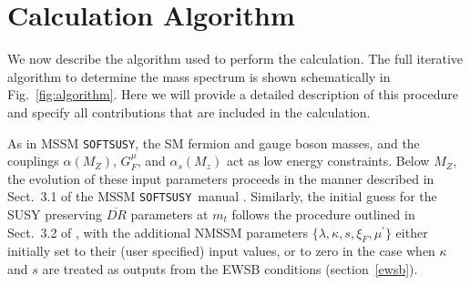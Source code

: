 \documentclass[final,3p,times]{elsarticle}
\def\SOFTSUSY{{\tt SOFTSUSY}}
\begin{document}
\section{Calculation Algorithm \label{sec:calculation}}
We now describe the algorithm used to perform the calculation.  The full 
iterative algorithm to determine the mass spectrum is shown schematically in 
Fig.~\ref{fig:algorithm}.  Here we will provide a detailed description of this 
procedure and specify all contributions that are included in the calculation.

As in MSSM \SOFTSUSY, the SM fermion and gauge boson masses, and the
 couplings $\alpha(M_Z)$, $G_F^\mu$, and $\alpha_s(M_z)$ act as low energy 
constraints. Below $M_Z$, the evolution of these input parameters proceeds in 
the manner described in Sect.\ 3.1 of the MSSM \SOFTSUSY~manual 
\cite{Allanach:2001kg}.  Similarly, the initial guess for the SUSY preserving 
$\overline{DR}$ parameters at $m_t$ follows the procedure outlined in Sect.\ 3.2
of \cite{Allanach:2001kg}, with the additional NMSSM parameters 
$\{\lambda, \kappa, s, \xi_F, \mu^\prime \}$ either initially set to their 
(user specified) input values, or to zero in the case when $\kappa$ and $s$ are 
treated as outputs from the EWSB conditions (section~\ref{ewsb}).
\end{document}
